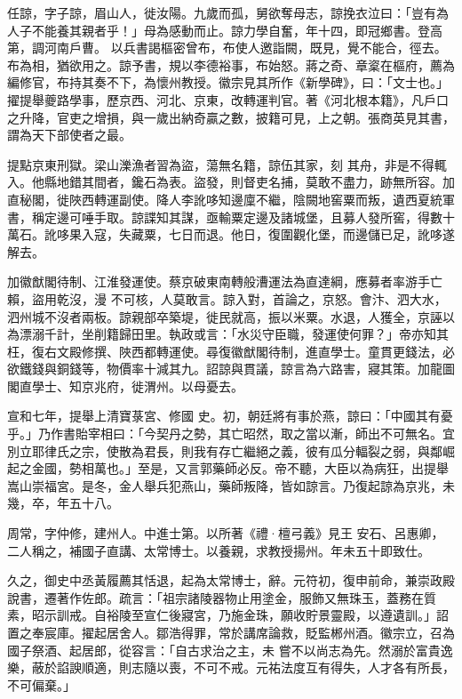 \begin{pinyinscope}
 任諒，字子諒，眉山人，徙汝陽。九歲而孤，舅欲奪母志，諒挽衣泣曰：「豈有為人子不能養其親者乎！」母為感動而止。諒力學自奮，年十四，即冠鄉書。登高第，調河南戶曹。
 以兵書謁樞密曾布，布使人邀詣闕，既見，覺不能合，徑去。布為相，猶欲用之。諒予書，規以李德裕事，布始怒。蔣之奇、章楶在樞府，薦為編修官，布持其奏不下，為懷州教授。徽宗見其所作《新學碑》，曰：「文士也。」擢提舉夔路學事，歷京西、河北、京東，改轉運判官。著《河北根本籍》，凡戶口之升降，官吏之增損，與一歲出納奇贏之數，披籍可見，上之朝。張商英見其書，謂為天下部使者之最。



 提點京東刑獄。梁山濼漁者習為盜，蕩無名籍，諒伍其家，刻
 其舟，非是不得輒入。他縣地錯其間者，鑱石為表。盜發，則督吏名捕，莫敢不盡力，跡無所容。加直秘閣，徙陜西轉運副使。降人李訛哆知邊廩不繼，陰闕地窖粟而叛，遺西夏統軍書，稱定邊可唾手取。諒諜知其謀，亟輸粟定邊及諸城堡，且募人發所窖，得數十萬石。訛哆果入寇，失藏粟，七日而退。他日，復圍觀化堡，而邊儲已足，訛哆遂解去。



 加徽猷閣待制、江淮發運使。蔡京破東南轉般漕運法為直達綱，應募者率游手亡賴，盜用乾沒，漫
 不可核，人莫敢言。諒入對，首論之，京怒。會汴、泗大水，泗州城不沒者兩板。諒親部卒築堤，徙民就高，振以米粟。水退，人獲全，京誣以為漂溺千計，坐削籍歸田里。執政或言：「水災守臣職，發運使何罪？」帝亦知其枉，復右文殿修撰、陜西都轉運使。尋復徽猷閣待制，進直學士。童貫更錢法，必欲鐵錢與銅錢等，物價率十減其九。詔諒與貫議，諒言為六路害，寢其策。加龍圖閣直學士、知京兆府，徙渭州。以母憂去。



 宣和七年，提舉上清寶菉宮、修國
 史。初，朝廷將有事於燕，諒曰：「中國其有憂乎。」乃作書貽宰相曰：「今契丹之勢，其亡昭然，取之當以漸，師出不可無名。宜別立耶律氏之宗，使散為君長，則我有存亡繼絕之義，彼有瓜分輻裂之弱，與鄰崛起之金國，勢相萬也。」至是，又言郭藥師必反。帝不聽，大臣以為病狂，出提舉嵩山崇福宮。是冬，金人舉兵犯燕山，藥師叛降，皆如諒言。乃復起諒為京兆，未幾，卒，年五十八。



 周常，字仲修，建州人。中進士第。以所著《禮·檀弓義》見王
 安石、呂惠卿，二人稱之，補國子直講、太常博士。以養親，求教授揚州。年未五十即致仕。



 久之，御史中丞黃履薦其恬退，起為太常博士，辭。元符初，復申前命，兼崇政殿說書，遷著作佐郎。疏言：「祖宗諸陵器物止用塗金，服飾又無珠玉，蓋務在質素，昭示訓戒。自裕陵至宣仁後寢宮，乃施金珠，願收貯景靈殿，以遵遺訓。」詔置之奉宸庫。擢起居舍人。鄒浩得罪，常於講席論救，貶監郴州酒。徽宗立，召為國子祭酒、起居郎，從容言：「自古求治之主，未
 嘗不以尚志為先。然溺於富貴逸樂，蔽於諂諛順適，則志隨以喪，不可不戒。元祐法度互有得失，人才各有所長，不可偏棄。」




\end{pinyinscope}
